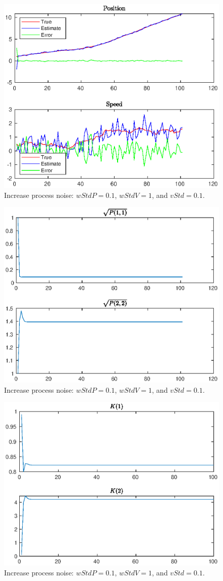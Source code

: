 \documentclass[11pt,a4paper]{article}
\begin{document}
\begin{itemize}
		\begin{figure}[H]
			\centering
			\includegraphics[width=0.57\columnwidth]{Warmup_Figure_1_wP_0_1_wV_1_vP_0_1.eps}
			\caption{Increase process noise: $wStdP = 0.1$, $wStdV = 1$, and $vStd = 0.1$.}
			\label{fig:Warmup_Figure_1_wP_0_1_wV_1_vP_0_1}
		\end{figure}
			
		\begin{figure}[H]
			\centering
			\includegraphics[width=0.57\columnwidth]{Warmup_Figure_2_wP_0_1_wV_1_vP_0_1.eps}
			\caption{Increase process noise: $wStdP = 0.1$, $wStdV = 1$, and $vStd = 0.1$.}
			\label{fig:Warmup_Figure_2_wP_0_1_wV_1_vP_0_1}
		\end{figure}
		
		\begin{figure}[H]
			\centering
			\includegraphics[width=0.57\columnwidth]{Warmup_Figure_3_wP_0_1_wV_1_vP_0_1.eps}
			\caption{Increase process noise: $wStdP = 0.1$, $wStdV = 1$, and $vStd = 0.1$.}
			\label{fig:Warmup_Figure_3_wP_0_1_wV_1_vP_0_1}
		\end{figure}
		

\end{itemize}
\end{document}
